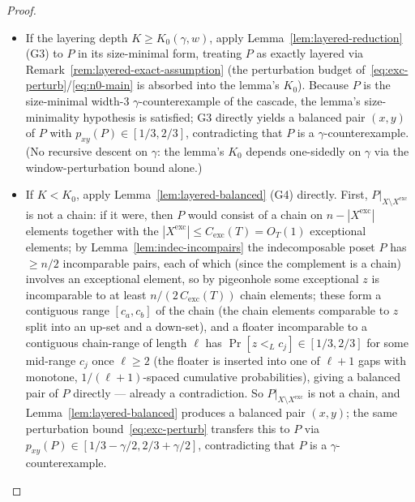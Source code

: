 \begin{proof}
\begin{itemize}[nosep]
 \item If the layering depth $K \ge K_0(\gamma, w)$, apply
 Lemma~\ref{lem:layered-reduction} (G3) to $P$ in its size-minimal
 form, treating $P$ as exactly layered via
 Remark~\ref{rem:layered-exact-assumption} (the perturbation budget
 of~\eqref{eq:exc-perturb}/\eqref{eq:n0-main} is absorbed into the
 lemma's $K_0$). Because $P$ is the size-minimal width-$3$
 $\gamma$-counter\-example of the cascade, the lemma's
 size-minimality hypothesis is satisfied; G3 directly yields a
 balanced pair $(x,y)$ of $P$ with $p_{xy}(P) \in [1/3, 2/3]$,
 contradicting that $P$ is a $\gamma$-counter\-example. (No
 recursive descent on $\gamma$: the lemma's $K_0$ depends one-sidedly
 on $\gamma$ via the window-perturbation bound alone.)
 \item If $K < K_0$, apply Lemma~\ref{lem:layered-balanced} (G4)
 directly. First, $P|_{X \setminus X^{\mathrm{exc}}}$ is not a chain:
 if it were, then $P$ would consist of a chain on
 $n - |X^{\mathrm{exc}}|$ elements together with the
 $|X^{\mathrm{exc}}| \le C_{\mathrm{exc}}(T) = O_T(1)$ exceptional
 elements; by Lemma~\ref{lem:indec-incompairs} the indecomposable
 poset $P$ has $\ge n/2$ incomparable pairs, each of which (since the
 complement is a chain) involves an exceptional element, so by
 pigeonhole some exceptional $z$ is incomparable to at least
 $n / (2\,C_{\mathrm{exc}}(T))$ chain elements; these form a
 contiguous range $[c_a, c_b]$ of the chain (the chain elements
 comparable to $z$ split into an up-set and a down-set), and a floater
 incomparable to a contiguous chain-range of length $\ell$ has
 $\Pr[z <_L c_j] \in [1/3, 2/3]$ for some mid-range $c_j$ once
 $\ell \ge 2$ (the floater is inserted into one of $\ell + 1$ gaps
 with monotone, $1/(\ell+1)$-spaced cumulative probabilities), giving
 a balanced pair of $P$ directly --- already a contradiction. So
 $P|_{X \setminus X^{\mathrm{exc}}}$ is not a chain, and
 Lemma~\ref{lem:layered-balanced} produces a balanced pair $(x,y)$;
 the same perturbation bound~\eqref{eq:exc-perturb} transfers this to
 $P$ via $p_{xy}(P) \in [1/3 - \gamma/2, 2/3 + \gamma/2]$,
 contradicting that $P$ is a $\gamma$-counter\-example.
\end{itemize}
\end{proof}
